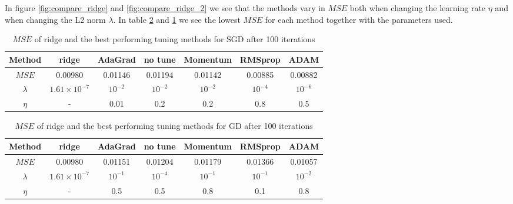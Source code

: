 \documentclass[11pt]{article}
\begin{document}
In figure \ref{fig:compare_ridge} and \ref{fig:compare_ridge_2} we see that the methods vary in $MSE$ both when changing the learning rate $\eta$ and when changing the L2 norm $\lambda$. In table \ref{tab:ridge_compare_GD} and \ref{tab:ridge_compare_SGD} we see the lowest $MSE$ for each method together with the parameters used.
\begin{table}[H]
    \centering
    \caption{$MSE$ of ridge and the best performing tuning methods for SGD after 100 iterations}
    \label{tab:ridge_compare_SGD}
    \begin{tabular}{|c|c|c|c|c|c|c|}
        \hline
        Method    & ridge               & AdaGrad   & no tune   & Momentum  & RMSprop   & ADAM      \\
        \hline
        $MSE$     & 0.00980             & 0.01146   & 0.01194   & 0.01142   & 0.00885   & 0.00882   \\
        \hline
        $\lambda$ & $1.61\times10^{-7}$ & $10^{-2}$ & $10^{-2}$ & $10^{-2}$ & $10^{-4}$ & $10^{-6}$ \\
        \hline
        $\eta$    & -                   & 0.01      & 0.2       & 0.2       & 0.8       & 0.5       \\
        \hline
    \end{tabular}
\end{table}
\begin{table}[H]
    \centering
    \caption{$MSE$ of ridge and the best performing tuning methods for GD after 100 iterations}
    \label{tab:ridge_compare_GD}
    \begin{tabular}{|c|c|c|c|c|c|c|}
        \hline
        Method    & ridge               & AdaGrad   & no tune   & Momentum  & RMSprop   & ADAM      \\
        \hline
        $MSE$     & 0.00980             & 0.01151   & 0.01204   & 0.01179   & 0.01366   & 0.01057   \\
        \hline
        $\lambda$ & $1.61\times10^{-7}$ & $10^{-1}$ & $10^{-4}$ & $10^{-1}$ & $10^{-1}$ & $10^{-2}$ \\
        \hline
        $\eta$    & -                   & 0.5       & 0.5       & 0.8       & 0.1       & 0.8       \\
        \hline
    \end{tabular}
\end{table}
\end{document}
